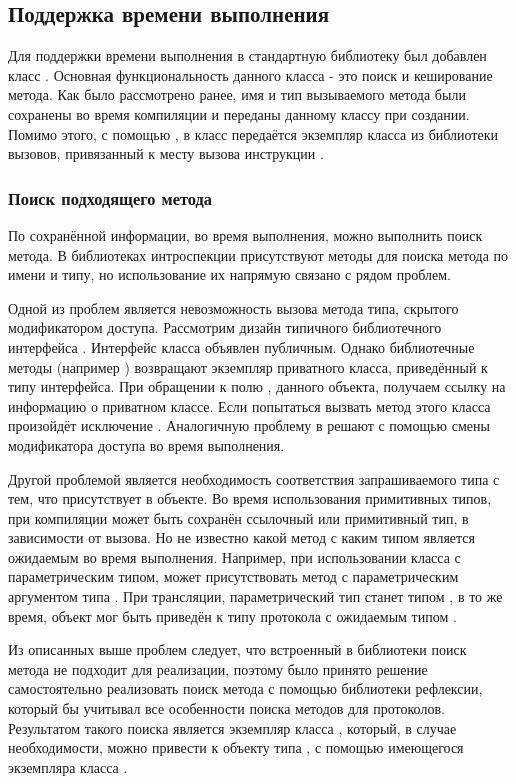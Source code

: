 \subsection{Поддержка времени выполнения} \label{runtime_info}
Для поддержки времени выполнения в стандартную библиотеку был добавлен класс . Основная функциональность данного класса - это поиск и кеширование метода. Как было рассмотрено ранее, имя и тип вызываемого метода были сохранены во время компиляции и переданы данному классу при создании. Помимо этого, с помощью , в класс передаётся экземпляр класса  из библиотеки вызовов, привязанный к месту вызова инструкции .

\subsubsection{Поиск подходящего метода}
По сохранённой информации, во время выполнения, можно выполнить поиск метода. В библиотеках интроспекции присутствуют методы для поиска метода по имени и типу, но использование их напрямую связано с рядом проблем.

Одной из проблем является невозможность вызова метода типа, скрытого модификатором доступа. Рассмотрим дизайн типичного библиотечного интерфейса . Интерфейс класса объявлен публичным. Однако библиотечные методы (например ) возвращают экземпляр приватного класса, приведённый к типу интерфейса. При обращении к полю , данного объекта, получаем ссылку на информацию о приватном классе. Если попытаться вызвать метод этого класса произойдёт исключение . Аналогичную проблему в  решают с помощью смены модификатора доступа во время выполнения.

Другой проблемой является необходимость соответствия запрашиваемого типа с тем, что присутствует в объекте. Во время использования примитивных типов, при компиляции может быть сохранён ссылочный или примитивный тип, в зависимости от вызова. Но не известно какой метод с каким типом является ожидаемым во время выполнения. Например, при использовании класса с параметрическим типом, может присутствовать метод с параметрическим аргументом типа . При трансляции, параметрический тип станет типом , в то же время, объект мог быть приведён к типу протокола с ожидаемым типом .

Из описанных выше проблем следует, что встроенный в библиотеки поиск метода не подходит для реализации, поэтому было принято решение самостоятельно реализовать поиск метода с помощью библиотеки рефлексии, который бы учитывал все особенности поиска методов для протоколов. Результатом такого поиска является экземпляр класса , который, в случае необходимости, можно привести к объекту типа , с помощью имеющегося экземпляра класса .

